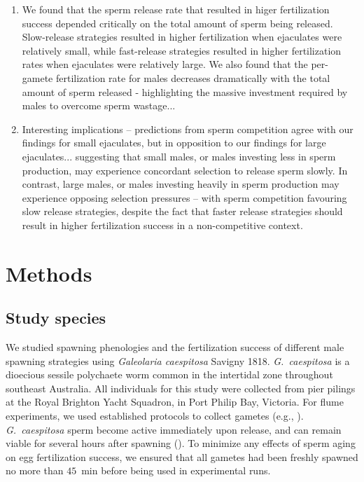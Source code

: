 \documentclass{article}
\begin{document}
\begin{enumerate}
\begin{enumerate}
			\item We found that the sperm release rate that resulted in higer fertilization success depended critically on the total amount of sperm being released. Slow-release strategies resulted in higher fertilization when ejaculates were relatively small, while fast-release strategies resulted in higher fertilization rates when ejaculates were relatively large. We also found that the per-gamete fertilization rate for males decreases dramatically with the total amount of sperm released - highlighting the massive investment required by males to overcome sperm wastage... 
			\item Interesting implications -- predictions from sperm competition agree with our findings for small ejaculates, but in opposition to our findings for large ejaculates... suggesting that small males, or males investing less in sperm production, may experience concordant selection to release sperm slowly. In contrast, large males, or males investing heavily in sperm production may experience opposing selection pressures -- with sperm competition favouring slow release strategies, despite the fact that faster release strategies should result in higher fertilization success in a non-competitive context.
		\end{enumerate}

\end{enumerate}



\section*{Methods}

	\subsection*{Study species}
	We studied spawning phenologies and the fertilization success of different male spawning strategies using \textit{Galeolaria caespitosa} Savigny 1818. \textit{G.~caespitosa} is a dioecious sessile polychaete worm common in the intertidal zone throughout southeast Australia. All individuals for this study were collected from pier pilings at the Royal Brighton Yacht Squadron, in Port Philip Bay, Victoria. For flume experiments, we used established protocols to collect gametes (e.g., \citealt{MarshallEvans2005a, MarshallEvans2005b}). \textit{G.~caespitosa} sperm become active immediately upon release, and can remain viable for several hours after spawning (\citealt{Kupriyanova2013}). To minimize any effects of sperm aging on egg fertilization success, we ensured that all gametes had been freshly spawned no more than $45$~min before being used in experimental runs.
\end{document}
